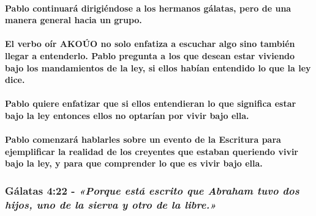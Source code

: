 \documentclass[11a pt,twoside]{article}
\newcommand{\scripture}[1]{%
  {\fontsize{12pt}{16pt}\selectfont\ScriptureFont\itshape #1}%
}
\let\oldsubsubsection\subsubsection
\renewcommand{\subsubsection}{\needspace{4\baselineskip}\oldsubsubsection}
\let\oldparagraph\paragraph
\renewcommand{\paragraph}{\needspace{3\baselineskip}\oldparagraph}
\begin{document}
\paragraph{Pablo continuará dirigiéndose a los hermanos gálatas, pero de
una manera general hacia un
grupo.}\label{pablo-continuaruxe1-dirigiuxe9ndose-a-los-hermanos-guxe1latas-pero-de-una-manera-general-hacia-un-grupo.}

\paragraph{El verbo oír AKOÚO no solo enfatiza a escuchar algo sino
también llegar a entenderlo. Pablo pregunta a los que desean estar
viviendo bajo los mandamientos de la ley, si ellos habían entendido lo
que la ley
dice.}\label{el-verbo-ouxedr-akouxfao-no-solo-enfatiza-a-escuchar-algo-sino-tambiuxe9n-llegar-a-entenderlo.-pablo-pregunta-a-los-que-desean-estar-viviendo-bajo-los-mandamientos-de-la-ley-si-ellos-habuxedan-entendido-lo-que-la-ley-dice.}

\paragraph{Pablo quiere enfatizar que si ellos entendieran lo que
significa estar bajo la ley entonces ellos no optarían por vivir bajo
ella.}\label{pablo-quiere-enfatizar-que-si-ellos-entendieran-lo-que-significa-estar-bajo-la-ley-entonces-ellos-no-optaruxedan-por-vivir-bajo-ella.}

\paragraph{Pablo comenzará hablarles sobre un evento de la Escritura
para ejemplificar la realidad de los creyentes que estaban queriendo
vivir bajo la ley, y para que comprender lo que es vivir bajo
ella.}\label{pablo-comenzaruxe1-hablarles-sobre-un-evento-de-la-escritura-para-ejemplificar-la-realidad-de-los-creyentes-que-estaban-queriendo-vivir-bajo-la-ley-y-para-que-comprender-lo-que-es-vivir-bajo-ella.}

\subsubsection{\texorpdfstring{Gálatas 4:22 -
\scripture{«Porque está escrito que Abraham tuvo dos hijos, uno de la sierva y otro de la libre.»}}{Gálatas 4:22 - }}\label{guxe1latas-422---porque-estuxe1-escrito-que-abraham-tuvo-dos-hijos-uno-de-la-sierva-y-otro-de-la-libre.}
\end{document}
